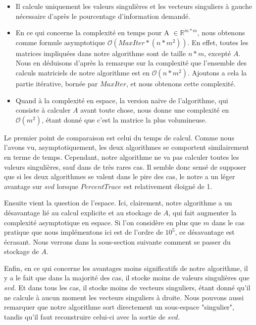 \documentclass[a4paper,12pt]{article}
\begin{document}
        \begin{itemize}
        \item Il calcule uniquement les valeurs singulières et les vecteurs
            singuliers à gauche nécessaire d'après le pourcentage d'information
            demandé.

        \item En ce qui concerne la complexité en temps pour A $\in
            \mathbb{R}^{m*m}$, nous obtenons comme formule asymptotique
            $\mathcal{O}(MaxIter*(n*m^2))$. En effet, toutes les matrices
            impliquées dans notre algorithme sont de taille $n*m$, excepté $A$.
            Nous en déduisons d'après la remarque sur la complexité que
            l'ensemble des calculs matriciels de notre algorithme est en
            $\mathcal{O}(n*m^2)$.  Ajoutons a cela la partie itérative, bornée
            par $MaxIter$, et nous obtenons cette complexité.

        \item Quand à la complexité en espace, la version naïve de l'algorithme,
            qui consiste à calculer $A$ avant toute chose, nous donne une
            complexité en $\mathcal{O}(m^2)$, étant donné que c'est la matrice
            la plus volumineuse.
        \end{itemize}

    \bigskip

        Le premier point de comparaison est celui du temps de calcul. Comme nous
        l'avons vu, asymptotiquement, les deux algorithmes se comportent
        similairement en terme de temps. Cependant, notre algorithme ne va pas
        calculer toutes les valeurs singulières, sauf dans de très rares cas. Il
        semble donc sensé de supposer que si les deux algorithmes se valent dans
        le pire des cas, le notre a un léger avantage sur $svd$ lorsque
        $PercentTrace$ est relativement éloigné de 1.

        Ensuite vient la question de l'espace. Ici, clairement, notre algorithme
        a un désavantage lié au calcul explicite et au stockage de $A$, qui fait
        augmenter la complexité asymptotique en espace. Si l'on considère en
        plus que $m$ dans le cas pratique que nous implémentons ici est de
        l'ordre de $10^5$, ce désavantage est écrasant. Nous verrons dans la
        sous-section suivante comment se passer du stockage de $A$.

        Enfin, en ce qui concerne les avantages moins significatifs de notre
        algorithme, il y a le fait que dans la majorité des cas, il stocke moins
        de valeurs singulières que $svd$. Et dans tous les cas, il stocke moins
        de vecteurs singuliers, étant donné qu'il ne calcule à aucun moment les
        vecteurs singuliers à droite. Nous pouvons aussi remarquer que notre
        algorithme sort directement un sous-espace "singulier", tandis qu'il
        faut reconstruire celui-ci avec la sortie de $svd$.
\end{document}
